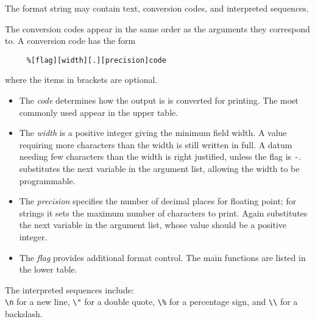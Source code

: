 \begin{minipage}{73mm}
The format string may contain text, conversion codes, and interpreted
sequences.  

The conversion codes appear in the same order as the arguments
they correspond to.  A conversion code has the form

\small
\begin{verbatim}
     %[flag][width][.][precision]code
\end{verbatim}
\normalsize
\normalsize

where the items in brackets are optional.
\begin{itemize}
\item
The {\em code} determines how the output is is converted for printing.
The most commonly used appear in the upper table.
\item
The {\em width} is a positive integer giving the minimum field width.
A value requiring more characters than the width is still written in
full.  A datum needing few characters than the width is right
justified, unless the flag is {\tt -}.  {\tt *} substitutes the next
variable in the argument list, allowing the width to be programmable.
\item
The {\em precision} specifies the number of decimal places for
floating point; for strings it sets the maximum number of characters
to print.  Again {\tt *} substitutes the next variable in the argument
list, whose value should be a positive integer.
\item
The {\em flag} provides additional format control.  The main functions
are listed in the lower table.
\end{itemize}

The interpreted sequences include:\\
{\tt \verb+\+n} for a new line, {\tt \verb+\+"} for a double quote,
{\tt \verb+\%+} for a percentage sign, and {\tt \verb+\\+} for a backslash.

\end{minipage}
\ \hfill \
